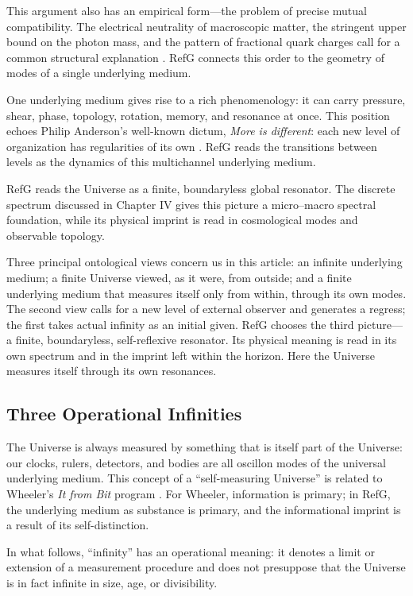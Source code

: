 \documentclass[11pt,a4paper]{article}
\begin{document}
This argument also has an empirical form---the problem of precise mutual compatibility. The electrical neutrality of macroscopic matter, the stringent upper bound on the photon mass, and the pattern of fractional quark charges call for a common structural explanation \citep{navas2024}. RefG connects this order to the geometry of modes of a single underlying medium.

One underlying medium gives rise to a rich phenomenology: it can carry pressure, shear, phase, topology, rotation, memory, and resonance at once. This position echoes Philip Anderson's well-known dictum, \textit{More is different}: each new level of organization has regularities of its own \citep{anderson1972}. RefG reads the transitions between levels as the dynamics of this multichannel underlying medium.

RefG reads the Universe as a finite, boundaryless global resonator. The discrete spectrum discussed in Chapter IV gives this picture a micro--macro spectral foundation, while its physical imprint is read in cosmological modes and observable topology.

Three principal ontological views concern us in this article: an infinite underlying medium; a finite Universe viewed, as it were, from outside; and a finite underlying medium that measures itself only from within, through its own modes. The second view calls for a new level of external observer and generates a regress; the first takes actual infinity as an initial given. RefG chooses the third picture---a finite, boundaryless, self-reflexive resonator. Its physical meaning is read in its own spectrum and in the imprint left within the horizon. Here the Universe measures itself through its own resonances.

\subsection{Three Operational Infinities}

The Universe is always measured by something that is itself part of the Universe: our clocks, rulers, detectors, and bodies are all oscillon modes of the universal underlying medium. This concept of a “self-measuring Universe” is related to Wheeler's \textit{It from Bit} program \citep{wheeler1990}. For Wheeler, information is primary; in RefG, the underlying medium as substance is primary, and the informational imprint is a result of its self-distinction.

In what follows, “infinity” has an operational meaning: it denotes a limit or extension of a measurement procedure and does not presuppose that the Universe is in fact infinite in size, age, or divisibility.
\end{document}
